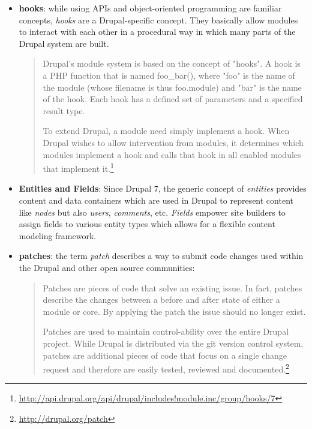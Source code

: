 \begin{itemize}

\item \textbf{hooks}: while using APIs and object-oriented programming are familiar concepts, \textit{hooks} are a Drupal-specific concept. They basically allow modules to interact with each other in a procedural way in which many parts of the Drupal system are built.

\begin{quote}
Drupal's module system is based on the concept of "hooks". A hook is a PHP function that is named foo\_bar(), where "foo" is the name of the module (whose filename is thus foo.module) and "bar" is the name of the hook. Each hook has a defined set of parameters and a specified result type.

To extend Drupal, a module need simply implement a hook. When Drupal wishes to allow intervention from modules, it determines which modules implement a hook and calls that hook in all enabled modules that implement it.\footnote{\url{http://api.drupal.org/api/drupal/includes!module.inc/group/hooks/7}}
\end{quote}

\item \textbf{Entities and Fields}: Since Drupal 7, the generic concept of \textit{entities} provides content and data containers which are used in Drupal to represent content like \textit{nodes} but also \textit{users}, \textit{comments}, etc. \textit{Fields} empower site builders to assign fields to various entity types which allows for a flexible content modeling framework\cite{klausi-thesis}.

\item \textbf{patches}: the term \textit{patch} describes a way to submit code changes used within the Drupal and other open source communities:

\begin{quote}
Patches are pieces of code that solve an existing issue. In fact, patches describe the changes between a before and after state of either a module or core. By applying the patch the issue should no longer exist.

Patches are used to maintain control-ability over the entire Drupal project. While Drupal is distributed via the git version control system, patches are additional pieces of code that focus on a single change request and therefore are easily tested, reviewed and documented.\footnote{\url{http://drupal.org/patch}}
\end{quote}

\end{itemize}

